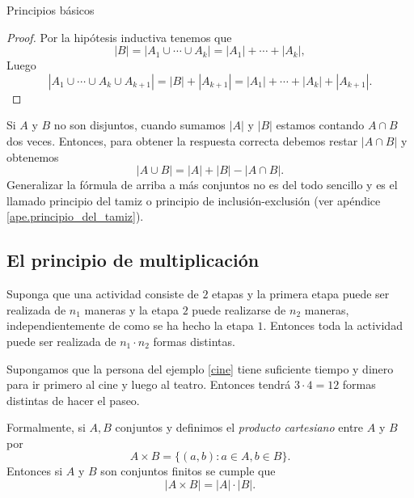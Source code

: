 \begin{section}{Principios básicos}
\begin{proof}
Por la hipótesis inductiva tenemos que 
$$
|B| = |A_1 \cup \cdots \cup A_k| =|A_1|+\cdots+|A_k|,
$$
Luego
$$
|A_1 \cup \cdots \cup A_k \cup  A_{k+1}| = |B|+|A_{k+1}| = |A_1|+\cdots+|A_k|+|A_{k+1}|.
$$
\end{proof}



Si $A$ y $B$ no son disjuntos, cuando sumamos $|A|$ y $|B|$ estamos contando $A \cap B$ dos veces. Entonces, para
obtener la respuesta correcta debemos restar $|A \cap B|$ y obtenemos
$$
|A \cup B| = |A|+|B| - |A \cap B|.
$$
Generalizar la fórmula de arriba a más conjuntos no es del todo sencillo y es el  llamado principio del tamiz o principio de inclusión-exclusión (ver apéndice \ref{ape.principio_del_tamiz}). 



\subsection*{El principio de multiplicación}

Suponga que una actividad consiste de $2$ etapas y la primera etapa puede ser realizada de $n_1$ maneras y la etapa $2$  puede realizarse de $n_2$  maneras, independientemente de como se ha hecho la etapa $1$. Entonces toda la actividad puede ser realizada de $n_1\cdot n_2$  formas distintas.


\begin{ejemplo*}
Supongamos que la persona del ejemplo \ref{cine} tiene suficiente tiempo y dinero para ir primero al cine y luego al teatro. Entonces tendrá  $3 \cdot 4=12$ formas distintas de hacer el paseo.
\end{ejemplo*}


Formalmente, si $A,B$ conjuntos y definimos el {\em producto cartesiano} entre $A$ y $B$ por
$$
A \times B = \{(a,b): a \in A, b \in B\}.
$$
Entonces si $A$ y $B$ son conjuntos finitos se cumple que
$$
|A \times B| = |A|\cdot|B|.  
$$

\end{section}

